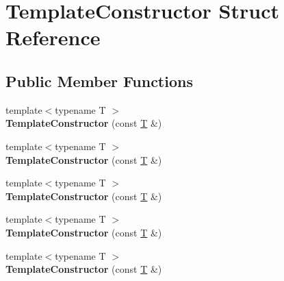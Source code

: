 \hypertarget{struct_template_constructor}{}\section{Template\+Constructor Struct Reference}
\label{struct_template_constructor}
\subsection*{Public Member Functions}
\begin{DoxyCompactItemize}
\item 
\mbox{\label{struct_template_constructor_a932be004f8fa3fb9cc3a5e13efe8c77a}} 
{\footnotesize template$<$typename T $>$ }\\{\bfseries Template\+Constructor} (const \mbox{\hyperlink{struct_t}{T}} \&)
\item 
\mbox{\label{struct_template_constructor_a932be004f8fa3fb9cc3a5e13efe8c77a}} 
{\footnotesize template$<$typename T $>$ }\\{\bfseries Template\+Constructor} (const \mbox{\hyperlink{struct_t}{T}} \&)
\item 
\mbox{\label{struct_template_constructor_a932be004f8fa3fb9cc3a5e13efe8c77a}} 
{\footnotesize template$<$typename T $>$ }\\{\bfseries Template\+Constructor} (const \mbox{\hyperlink{struct_t}{T}} \&)
\item 
\mbox{\label{struct_template_constructor_a932be004f8fa3fb9cc3a5e13efe8c77a}} 
{\footnotesize template$<$typename T $>$ }\\{\bfseries Template\+Constructor} (const \mbox{\hyperlink{struct_t}{T}} \&)
\item 
\mbox{\label{struct_template_constructor_a932be004f8fa3fb9cc3a5e13efe8c77a}} 
{\footnotesize template$<$typename T $>$ }\\{\bfseries Template\+Constructor} (const \mbox{\hyperlink{struct_t}{T}} \&)
\item 
\mbox{\label{struct_template_constructor_a932be004f8fa3fb9cc3a5e13efe8c77a}} 

\end{DoxyCompactItemize}
